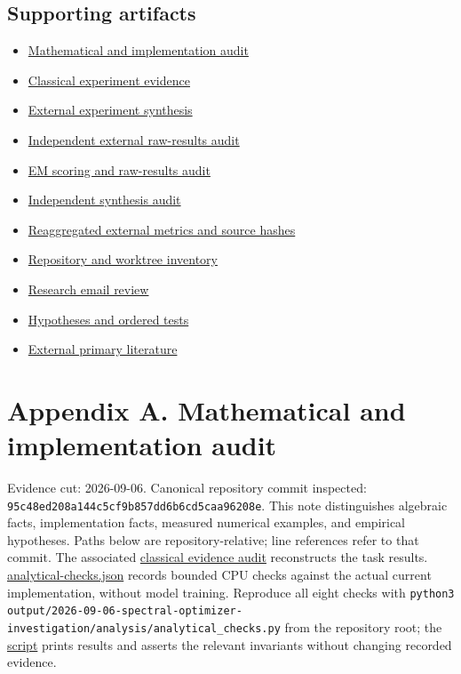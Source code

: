 \documentclass[
  british,
  10pt,
  a4paper,
]{article}
\providecommand{\tightlist}{%
  \setlength{\itemsep}{0pt}\setlength{\parskip}{0pt}}
\begin{document}
\subsection{Supporting artifacts}\label{synthesis--supporting-artifacts}

\begin{itemize}
\tightlist
\item
  \hyperref[mathematical-audit]{Mathematical and implementation audit}
\item
  \hyperref[classical-evidence]{Classical experiment evidence}
\item
  \hyperref[external-studies]{External experiment synthesis}
\item
  \hyperref[external-results-audit]{Independent external
  raw-\allowbreak{}results audit}
\item
  \hyperref[em-results-audit]{EM scoring and raw-\allowbreak{}results
  audit}
\item
  \hyperref[final-synthesis-audit]{Independent synthesis audit}
\item
  \href{../analysis/external-evidence.json}{Reaggregated external
  metrics and source hashes}
\item
  \hyperref[repository-inventory]{Repository and worktree inventory}
\item
  \hyperref[email-evidence]{Research email review}
\item
  \hyperref[hypotheses-and-tests]{Hypotheses and ordered tests}
\item
  \hyperref[primary-literature]{External primary literature}
\end{itemize}

\clearpage

\section{Appendix A. Mathematical and implementation
audit}\label{mathematical-audit}

Evidence cut: 2026-\allowbreak{}09-\allowbreak{}06.\allowbreak{}
Canonical repository commit inspected:
\texttt{95c48ed208a1\allowbreak{}44c5cf9b857d\allowbreak{}d6b6cd5caa96\allowbreak{}208e}.
This note distinguishes algebraic facts, implementation facts, measured
numerical examples, and empirical hypotheses.\allowbreak{} Paths below
are repository-\allowbreak{}relative; line references refer to that
commit. The associated \hyperref[classical-evidence]{classical evidence
audit} reconstructs the task results.
\href{../analysis/analytical-checks.json}{analytical-\allowbreak{}checks.\allowbreak{}json}
records bounded CPU checks against the actual current
implementati\allowbreak{}on,\allowbreak{} without model training.
Reproduce all eight checks with
\texttt{python3 \allowbreak{}output/\allowbreak{}2026-\allowbreak{}09-\allowbreak{}06-\allowbreak{}spectral-\allowbreak{}optimizer-\allowbreak{}investigatio\allowbreak{}n/\allowbreak{}analysis/\allowbreak{}analytical\_\allowbreak{}checks.\allowbreak{}py}
from the repository root; the
\href{../analysis/analytical_checks.py}{script} prints results and
asserts the relevant invariants without changing recorded evidence.
\end{document}
